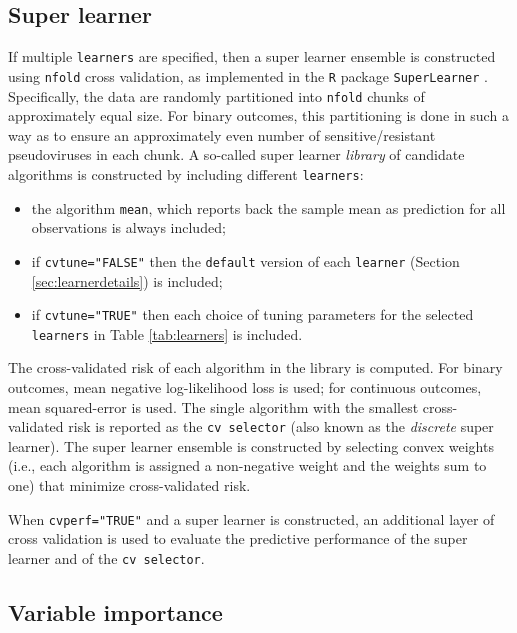 \documentclass[]{article}
\providecommand{\tightlist}{%
  \setlength{\itemsep}{0pt}\setlength{\parskip}{0pt}}
\begin{document}
\subsection{Super learner}\label{sec:sldetails}

If multiple \texttt{learners} are specified, then a super learner
ensemble \citep{vanderlaan2007} is constructed using \texttt{nfold}
cross validation, as implemented in the \texttt{R} package
\texttt{SuperLearner} \citep{superlearnerpkg}. Specifically, the data
are randomly partitioned into \texttt{nfold} chunks of approximately
equal size. For binary outcomes, this partitioning is done in such a way
as to ensure an approximately even number of sensitive/resistant
pseudoviruses in each chunk. A so-called super learner \emph{library} of
candidate algorithms is constructed by including different
\texttt{learners}:

\begin{itemize}
\tightlist
\item
  the algorithm \texttt{mean}, which reports back the sample mean as
  prediction for all observations is always included;
\item
  if \texttt{cvtune="FALSE"} then the \texttt{default} version of each
  \texttt{learner} (Section \ref{sec:learnerdetails}) is included;
\item
  if \texttt{cvtune="TRUE"} then each choice of tuning parameters for
  the selected \texttt{learners} in Table \ref{tab:learners} is
  included.
\end{itemize}

The cross-validated risk of each algorithm in the library is computed.
For binary outcomes, mean negative log-likelihood loss is used; for
continuous outcomes, mean squared-error is used. The single algorithm
with the smallest cross-validated risk is reported as the
\texttt{cv\ selector} (also known as the \emph{discrete} super learner).
The super learner ensemble is constructed by selecting convex weights
(i.e., each algorithm is assigned a non-negative weight and the weights
sum to one) that minimize cross-validated risk.

When \texttt{cvperf="TRUE"} and a super learner is constructed, an
additional layer of cross validation is used to evaluate the predictive
performance of the super learner and of the \texttt{cv\ selector}.

\subsection{Variable importance}\label{variable-importance}
\end{document}
